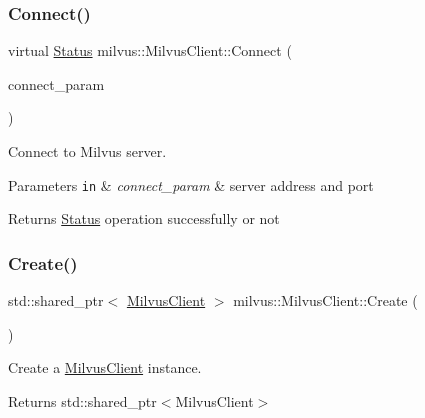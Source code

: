 \subsubsection{\texorpdfstring{Connect()}{Connect()}}
{\footnotesize\ttfamily virtual \hyperlink{classmilvus_1_1_status}{Status} milvus\+::\+Milvus\+Client\+::\+Connect (\begin{DoxyParamCaption}\item[{const \hyperlink{classmilvus_1_1_connect_param}{Connect\+Param} \&}]{connect\+\_\+param }\end{DoxyParamCaption})\hspace{0.3cm}{\ttfamily [pure virtual]}}

Connect to Milvus server.


\begin{DoxyParams}[1]{Parameters}
\mbox{\tt in}  & {\em connect\+\_\+param} & server address and port \\
\hline
\end{DoxyParams}
\begin{DoxyReturn}{Returns}
\hyperlink{classmilvus_1_1_status}{Status} operation successfully or not 
\end{DoxyReturn}
\mbox{\label{classmilvus_1_1_milvus_client_a2fadefe95c16f9a5ea11bc899fc878bd}} 
\subsubsection{\texorpdfstring{Create()}{Create()}}
{\footnotesize\ttfamily std\+::shared\+\_\+ptr$<$ \hyperlink{classmilvus_1_1_milvus_client}{Milvus\+Client} $>$ milvus\+::\+Milvus\+Client\+::\+Create (\begin{DoxyParamCaption}{ }\end{DoxyParamCaption})\hspace{0.3cm}{\ttfamily [static]}}

Create a \hyperlink{classmilvus_1_1_milvus_client}{Milvus\+Client} instance.

\begin{DoxyReturn}{Returns}
std\+::shared\+\_\+ptr$<$\+Milvus\+Client$>$ 
\end{DoxyReturn}
\mbox{\label{classmilvus_1_1_milvus_client_ac60416ac8d3a1acee393d9d0194cc14e}} 
